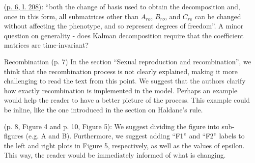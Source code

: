 
\begin{point}{}
\hyperlink{rev2:4}{(p. 6, l. 208)}: ``both the change of basis used to obtain the decomposition and, once in this form, all submatrices other than $A_{ro}$, $B_{ro}$, and $C_{ro}$ can be changed without affecting the phenotype, and so represent degrees of freedom''. A minor question on generality - does Kalman decomposition require that the coefficient matrices are time-invariant?
\end{point}


\begin{point}{Recombination}
(p. 7) In the section ``Sexual reproduction and recombination'', we think that the recombination process is not clearly explained, making it more challenging to read the text from this point. We suggest that the authors clarify how exactly recombination is implemented in the model. Perhaps an example would help the reader to have a better picture of the process. This example could be inline, like the one introduced in the section on Haldane's rule.
\end{point}


\begin{point}{}
(p. 8, Figure 4 and p. 10, Figure 5): We suggest dividing the figure into sub-figures (e.g. A and B). Furthermore, we suggest adding ``F1'' and ``F2'' labels to the left and right plots in Figure 5, respectively, as well as the values of epsilon. This way, the reader would be immediately informed of what is changing.
\end{point}


